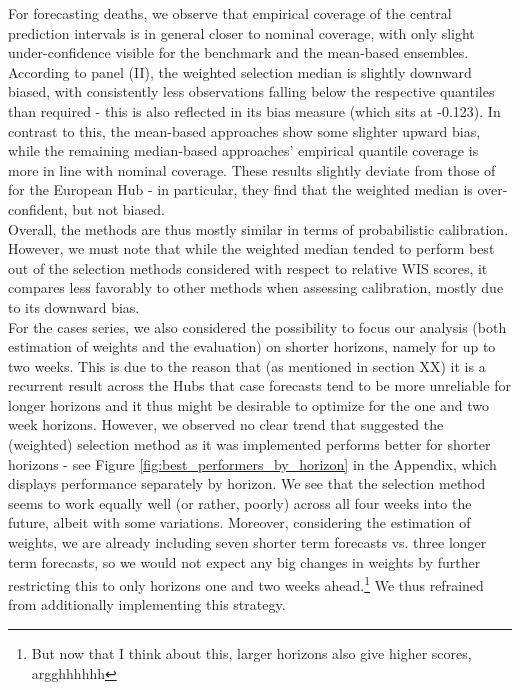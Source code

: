 For forecasting deaths, we observe that empirical coverage of the central prediction intervals is in general closer to nominal coverage, with only slight under-confidence visible for the benchmark and the mean-based ensembles. According to panel (II), the weighted selection median is slightly downward biased, with consistently less observations falling below the respective quantiles than required - this is also reflected in its bias measure (which sits at -0.123). In contrast to this, the mean-based approaches show some slighter upward bias,  while the remaining median-based approaches' empirical quantile coverage is more in line with nominal coverage. These results slightly deviate from those of \cite{ray_comparing_2022} for the European Hub - in particular, they find that the weighted median is over-confident, but not biased. \\ %
Overall, the methods are thus mostly similar in terms of probabilistic calibration. However, we must note that while the weighted median tended to perform best out of the selection methods considered with respect to relative WIS scores, it compares less favorably to other methods when assessing calibration, mostly due to its downward bias. \medskip \\%
For the cases series, we also considered the possibility to focus our analysis (both estimation of weights and the evaluation) on shorter horizons, namely for up to two weeks. This is due to the reason that (as mentioned in section XX) it is a recurrent result across the Hubs that case forecasts tend to be more unreliable for longer horizons and it thus might be desirable to optimize for the one and two week horizons. However, we observed no clear trend that suggested the (weighted) selection method as it was implemented performs better for shorter horizons - see Figure \ref{fig:best_performers_by_horizon} in the Appendix, which displays performance separately by horizon. We see that the selection method seems to work equally well (or rather, poorly) across all four weeks into the future, albeit with some variations. Moreover, considering the estimation of weights, we are already including seven shorter term forecasts vs. three longer term forecasts, so we would not expect any big changes in weights by further restricting this to only horizons one and two weeks ahead.\footnote{But now that I think about this, larger horizons also give higher scores, argghhhhhh} We thus refrained from additionally implementing this strategy. \medskip \\
